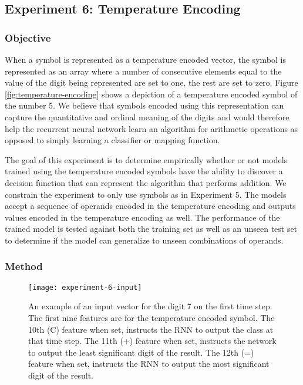 \subsection{Experiment 6: Temperature Encoding} \label{sec:experiment-6}

\subsubsection{Objective}

When a symbol is represented as a temperature encoded vector, the symbol is represented as an array where a number of consecutive elements equal to the value of the digit being represented are set to one, the rest are set to zero. Figure \ref{fig:temperature-encoding} shows a depiction of a temperature encoded symbol of the number 5. We believe that symbols encoded using this representation can capture the quantitative and ordinal meaning of the digits and would therefore help the recurrent neural network learn an algorithm for arithmetic operations as opposed to simply learning a classifier or mapping function.

The goal of this experiment is to determine empirically whether or not models trained using the temperature encoded symbols have the ability to discover a decision function that can represent the algorithm that performs addition. We constrain the experiment to only use symbols as in Experiment 5. The models accept a sequence of operands encoded in the temperature encoding and outputs values encoded in the temperature encoding as well. The performance of the trained model is tested against both the training set as well as an unseen test set to determine if the model can generalize to unseen combinations of operands. 

\subsubsection{Method}

\begin{figure}
	\centering
	\texttt{[image: experiment-6-input]}
	\caption{An example of an input vector for the digit 7 on the first time step. The first nine features are for the temperature encoded symbol. The 10th (C) feature when set, instructs the RNN to output the class at that time step. The 11th (+) feature when set, instructs the network to output the least significant digit of the result. The 12th (=) feature when set, instructs the RNN to output the most significant digit of the result.}
	\label{fig:experiment-6-input}
\end{figure}

